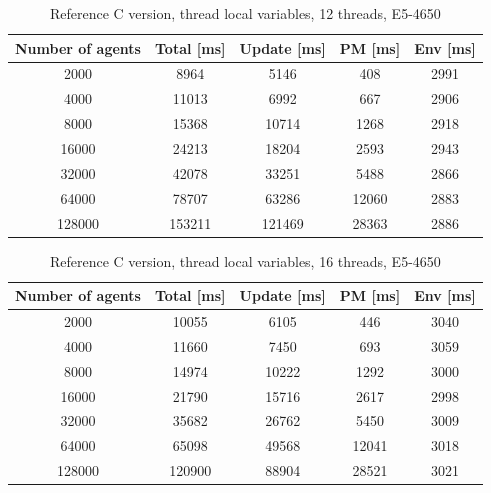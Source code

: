 \documentclass[12pt, a4paper]{report}
\begin{document}
\begin{appendices}
\begin{table}[H]
  \begin{center}
    \begin{tabular}{|c||c||c|c|c|}
    \hline
    Number of agents & Total [ms] & Update [ms] & PM [ms] & Env [ms] \\ \hline
    2000             & 8964       & 5146        & 408     & 2991     \\
    4000             & 11013      & 6992        & 667     & 2906     \\
    8000             & 15368      & 10714       & 1268    & 2918     \\
    16000            & 24213      & 18204       & 2593    & 2943     \\
    32000            & 42078      & 33251       & 5488    & 2866     \\
    64000            & 78707      & 63286       & 12060   & 2883     \\
    128000           & 153211     & 121469      & 28363   & 2886     \\ \hline
    \end{tabular}
    \caption {Reference C version, thread local variables, 12 threads, E5-4650}
    \label{table:append-reference-timings-12-thread-potoo}
  \end{center}
\end{table}

\begin{table}[H]
  \begin{center}
    \begin{tabular}{|c||c||c|c|c|}
    \hline
    Number of agents & Total [ms] & Update [ms] & PM [ms] & Env [ms] \\ \hline
    2000             & 10055      & 6105        & 446     & 3040     \\
    4000             & 11660      & 7450        & 693     & 3059     \\
    8000             & 14974      & 10222       & 1292    & 3000     \\
    16000            & 21790      & 15716       & 2617    & 2998     \\
    32000            & 35682      & 26762       & 5450    & 3009     \\
    64000            & 65098      & 49568       & 12041   & 3018     \\
    128000           & 120900     & 88904       & 28521   & 3021     \\ \hline
    \end{tabular}
    \caption {Reference C version, thread local variables, 16 threads, E5-4650}
    \label{table:append-reference-timings-16-thread-potoo}
  \end{center}
\end{table}



\end{appendices}
\end{document}
